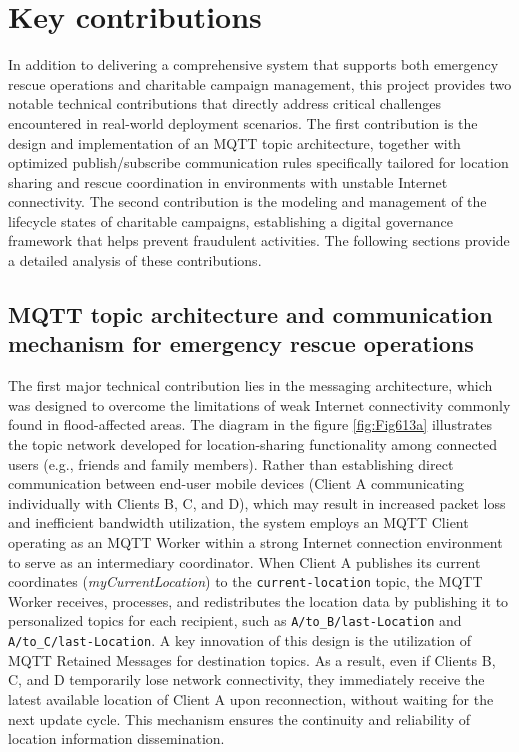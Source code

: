 \documentclass[../Main.tex]{subfiles}
\begin{document}
\section{Key contributions}

In addition to delivering a comprehensive system that supports both emergency rescue operations and charitable campaign management, this project provides two notable technical contributions that directly address critical challenges encountered in real-world deployment scenarios. The first contribution is the design and implementation of an MQTT topic architecture, together with optimized publish/subscribe communication rules specifically tailored for location sharing and rescue coordination in environments with unstable Internet connectivity. The second contribution is the modeling and management of the lifecycle states of charitable campaigns, establishing a digital governance framework that helps prevent fraudulent activities. The following sections provide a detailed analysis of these contributions.

\subsection{MQTT topic architecture and communication mechanism for emergency rescue operations}

The first major technical contribution lies in the messaging architecture, which was designed to overcome the limitations of weak Internet connectivity commonly found in flood-affected areas. The diagram in the figure \ref{fig:Fig613a} illustrates the topic network developed for location-sharing functionality among connected users (e.g., friends and family members). Rather than establishing direct communication between end-user mobile devices (Client A communicating individually with Clients B, C, and D), which may result in increased packet loss and inefficient bandwidth utilization, the system employs an MQTT Client operating as an MQTT Worker within a strong Internet connection environment to serve as an intermediary coordinator. When Client A publishes its current coordinates (\textit{myCurrentLocation}) to the \texttt{current-location} topic, the MQTT Worker receives, processes, and redistributes the location data by publishing it to personalized topics for each recipient, such as \texttt{A/to\_B/last-Location} and \texttt{A/to\_C/last-Location}. A key innovation of this design is the utilization of MQTT Retained Messages for destination topics. As a result, even if Clients B, C, and D temporarily lose network connectivity, they immediately receive the latest available location of Client A upon reconnection, without waiting for the next update cycle. This mechanism ensures the continuity and reliability of location information dissemination.
\end{document}
